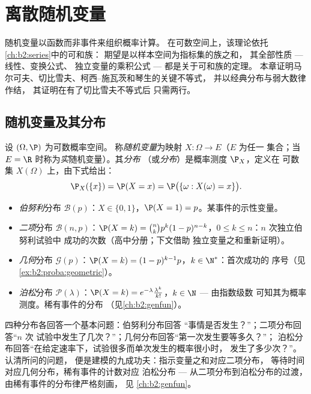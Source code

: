 \chapter{离散随机变量}\label{ch:b2:randomvar}

随机变量以函数而非事件来组织概率计算。
在可数空间上，该理论依托
\cref{ch:b2:series}中的可和族：
期望是以样本空间为指标集的族之和，
其全部性质 --- 线性、变换公式、
独立变量的乘积公式 --- 都是关于可和族的定理。
本章证明马尔可夫、切比雪夫、柯西–施瓦茨和琴生的关键不等式，
并以经典分布与弱大数律作结，
其证明在有了切比雪夫不等式后
只需两行。

\section{随机变量及其分布}

\begin{definition}[离散随机变量；分布]\label{def:b2:randomvar:law}
设 $(\Omega, \P)$ 为可数概率空间。
称\emph{随机变量}为映射 $X \colon \Omega \to E$（$E$ 为任一
集合；当 $E = \R$ 时称为\emph{实}随机变量）。其\emph{分布}
（或\emph{分布}）是概率测度 $\P_X$，定义在
可数集 $X(\Omega)$ 上，由下式给出：
\[
\P_X(\{x\}) = \P(X = x)
= \P\bigl(\{\omega : X(\omega) = x\}\bigr) .
\]
\end{definition}

\begin{example}[经典分布]\label{ex:b2:randomvar:laws}
\leavevmode
\begin{itemize}
\item \emph{伯努利}分布 $\mathcal{B}(p)$：$X \in \{0, 1\}$，$\P(X =
1) = p$。某事件的示性变量。
\item \emph{二项}分布 $\mathcal{B}(n, p)$：$\P(X = k) =
\binom nk p^k(1-p)^{n-k}$，$0 \leq k \leq n$：$n$ 次独立伯努利试验中
成功的次数（高中分册；下文借助
独立变量之和重新证明）。
\item \emph{几何}分布 $\mathcal{G}(p)$：$\P(X = k) =
(1-p)^{k-1}p$，$k \in \N^*$：首次成功的
序号（见\cref{ex:b2:proba:geometric}）。
\item \emph{泊松}分布 $\mathcal{P}(\lambda)$：$\P(X = k) =
e^{-\lambda}\frac{\lambda^k}{k!}$，$k \in \N$ --- 由指数级数
可知其为概率测度。稀有事件的分布
（见\cref{ch:b2:genfun}）。
\end{itemize}
\end{example}

\begin{remark}[各分布分别刻画什么]
四种分布各回答一个基本问题：伯努利分布回答
“事情是否发生？”；二项分布回答“$n$ 次
试验中发生了几次？”；几何分布回答“第一次发生要等多久？”；
泊松分布回答“在给定速率下，试验很多而单次发生的概率很小时，
发生了多少次？”。认清所问的问题，
便是建模的九成功夫：指示变量之和对应二项分布，
等待时间对应几何分布，稀有事件的计数对应
泊松分布 --- 从二项分布到泊松分布的过渡，由稀有事件的分布律严格刻画，
见
\cref{ch:b2:genfun}。
\end{remark}

